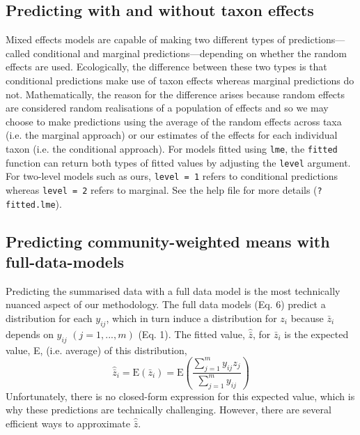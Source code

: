 \documentclass[12pt]{ecologyFORAPPENDIX}
\begin{document}
\subsection{Predicting with and without taxon effects}

Mixed effects models are capable of making two different types of predictions---called conditional and marginal predictions---depending on whether the random effects are used.  Ecologically, the difference between these two types is that conditional predictions make use of taxon effects whereas marginal predictions do not.  Mathematically, the reason for the difference arises because random effects are considered random realisations of a population of effects and so we may choose to make predictions using the average of the random effects across taxa (i.e. the marginal approach) or our estimates of the effects for each individual taxon (i.e. the conditional approach).  For models fitted using \texttt{lme}, the \texttt{fitted} function can return both types of fitted values by adjusting the \texttt{level} argument.  For two-level models such as ours, \texttt{level = 1} refers to conditional predictions whereas \texttt{level = 2} refers to marginal.  See the help file for more details (\texttt{?fitted.lme}).

\subsection{Predicting community-weighted means with full-data-models}

Predicting the summarised data with a full data model is the most technically nuanced aspect of our methodology.  The full data models (Eq. 6) predict a distribution for each $y_{ij}$, which in turn induce a distribution for $z_i$ because $\bar{z}_i$ depends on $y_{ij}$ $(j = 1,...,m)$ (Eq. 1).  The fitted value, $\hat{\bar{z}}$, for $\bar{z}_i$ is the expected value, E, (i.e. average) of this distribution,
\begin{equation}
\hat{\bar{z}}_i = \mathrm{E}(\bar{z}_i) = \mathrm{E}\left(\frac{\sum_{j=1}^m y_{ij} z_j}{\sum_{j=1}^m y_{ij}} \right)
\end{equation}
Unfortunately, there is no closed-form expression for this expected value, which is why these predictions are technically challenging.  However, there are several efficient ways to approximate $\hat{\bar{z}}$.
\end{document}

